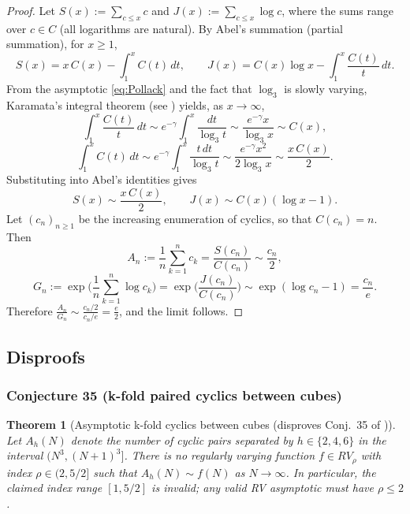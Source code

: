 \documentclass[12pt]{article}
\newtheorem{theorem}{Theorem}
\theoremstyle{remark}
\begin{document}
\begin{proof}
Let $S(x):=\sum_{c\le x} c$ and $J(x):=\sum_{c\le x} \log c$, where the sums range over $c\in C$ (all logarithms are natural). By Abel's summation (partial summation), for $x\ge1$,
\[
 S(x)=x\,C(x)-\int_1^x C(t)\,dt,\qquad J(x)=C(x)\log x-\int_1^x \frac{C(t)}{t}\,dt.
\]
From the asymptotic \eqref{eq:Pollack} and the fact that $\log_3$ is slowly varying, Karamata's integral theorem (see \cite[\S1.6]{BGT1989}) yields, as $x\to\infty$,
\[
 \int_1^x \frac{C(t)}{t}\,dt\sim e^{-\gamma}\int_1^x \frac{dt}{\log_3 t}\sim \frac{e^{-\gamma}x}{\log_3 x}\sim C(x),
\]
\[
 \int_1^x C(t)\,dt\sim e^{-\gamma}\int_1^x \frac{t\,dt}{\log_3 t}\sim \frac{e^{-\gamma}x^2}{2\log_3 x}\sim \frac{x\,C(x)}{2}.
\]
Substituting into Abel's identities gives
\[
 S(x)\sim \frac{x\,C(x)}{2},\qquad J(x)\sim C(x)(\log x-1).
\]
Let $(c_n)_{n\ge1}$ be the increasing enumeration of cyclics, so that $C(c_n)=n$. Then
\[
 A_n:=\frac{1}{n}\sum_{k=1}^n c_k=\frac{S(c_n)}{C(c_n)}\sim \frac{c_n}{2},
\]
\[
 G_n:=\exp\!\Big(\frac{1}{n}\sum_{k=1}^n \log c_k\Big)=\exp\!\Big(\frac{J(c_n)}{C(c_n)}\Big)\sim \exp(\log c_n-1)=\frac{c_n}{e}.
\]
Therefore $\displaystyle \frac{A_n}{G_n}\sim \frac{c_n/2}{c_n/e}=\frac{e}{2}$, and the limit follows.
\end{proof}


\subsection{Disproofs}

\subsubsection{Conjecture 35 (k-fold paired cyclics between cubes)}
\begin{theorem}[Asymptotic k-fold cyclics between cubes (disproves Conj.~35 of \cite{Cohen2025})]\label{thm:asymptotic_k_fold_cyclics_between_cubes}
Let $A_h(N)$ denote the number of cyclic pairs separated by $h\in\{2,4,6\}$ in the interval $(N^3,(N+1)^3]$. There is no regularly varying function $f\in RV_\rho$ with index $\rho\in(2,5/2]$ such that $A_h(N)\sim f(N)$ as $N\to\infty$. In particular, the claimed index range $[1,5/2]$ is invalid; any valid RV asymptotic must have $\rho\le 2$.
\end{theorem}
\end{document}

